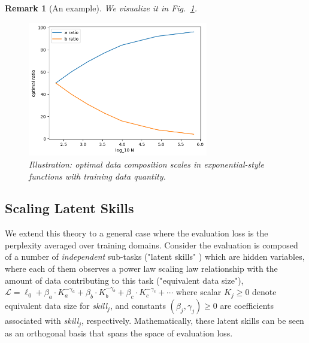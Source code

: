 \documentclass{article} %
\newtheorem{remark}{Remark}
\begin{document}
\begin{appendices}{}
\begin{remark} [An example]
We visualize it in Fig.~\ref{fig:example}.
\begin{figure}[h!]
\begin{center}
  \includegraphics[width=0.7\textwidth]{figs/abratio.png}
  \vspace{-1em}
  \caption{Illustration: optimal data composition scales in exponential-style functions with training data quantity.
  }\label{fig:example}
  \vspace{-1em}
  \end{center}
\end{figure}%
\end{remark}




\subsection{Scaling Latent Skills}\label{app:theorem1}
We extend this theory to a general case where the evaluation loss is the perplexity averaged over training domains.
Consider the evaluation is composed of a number of \textit{independent} sub-tasks ("latent skills" \citep{tiong2024toward}) which are hidden variables, where each of them observes a power law scaling law relationship with the amount of data contributing to this task ("equivalent data size"), $
\mathcal{L} =\ell_0+\beta_a\cdot K_a^{-\gamma_a}+\beta_b\cdot K_b^{-\gamma_b}+\beta_c\cdot K_c^{-\gamma_c} + \cdots
$
where scalar $K_j\geq 0$ denote equivalent data size for \textit{skill$_j$}, and constants $(\beta_j, \gamma_j)\geq 0$ are coefficients associated with \textit{skill$_j$}, respectively. Mathematically, these latent skills can be seen as an orthogonal basis that spans the space of evaluation loss.


\end{appendices}
\end{document}
